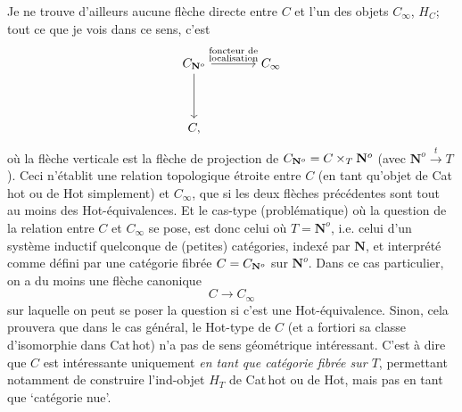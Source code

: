 Je ne trouve d'ailleurs aucune flèche directe entre $C$ et l'un des objets $C_{\infty}$, $H_{C}$; tout ce que je vois dans ce sens, c'est
\[
\begin{tikzcd}[column sep=large, row sep=huge]
\CNo \arrow[r, "{\substack{\text{foncteur de}\\ \text{localisation}}}"] \arrow[d] & C_{\infty} \\
C, &
\end{tikzcd}
\]
où la flèche verticale est la flèche de projection de $C_{\mathbf{N}^{o}} = C \times_{T} \mathbf{N}^{o}$ (avec $\mathbf{N}^{o} \xrightarrow{\ t\ } T$). Ceci n'établit une relation topologique étroite entre $C$ (en tant qu'objet de Cat\,hot ou de Hot simplement) et $C_{\infty}$, que si les deux flèches précédentes sont tout au moins des Hot-équivalences. Et le cas-type (problématique) où la question de la relation entre $C$ et $C_{\infty}$ se pose, est donc celui où $T = \mathbf{N}^{o}$, i.e. celui d'un système inductif quelconque de (petites) catégories, indexé par $\mathbf{N}$, et interprété comme défini par une catégorie fibrée $C = C_{\mathbf{N}^{o}}$ sur $\mathbf{N}^{o}$. Dans ce cas particulier, on a du moins une flèche canonique
\[
C \longrightarrow C_{\infty}
\]
sur laquelle on peut se poser la question si c'est
une Hot-équivalence. Sinon, cela prouvera que dans le cas général, le Hot-type de $C$ (et a fortiori sa classe d'isomorphie dans Cat\,hot) n'a pas de sens géométrique intéressant. C'est à dire que $C$ est intéressante uniquement \textit{en tant que catégorie fibrée sur $T$}, permettant notamment de construire l'ind-objet $H_{T}$ de Cat\,hot ou de Hot, mais pas en tant que `catégorie nue'.

